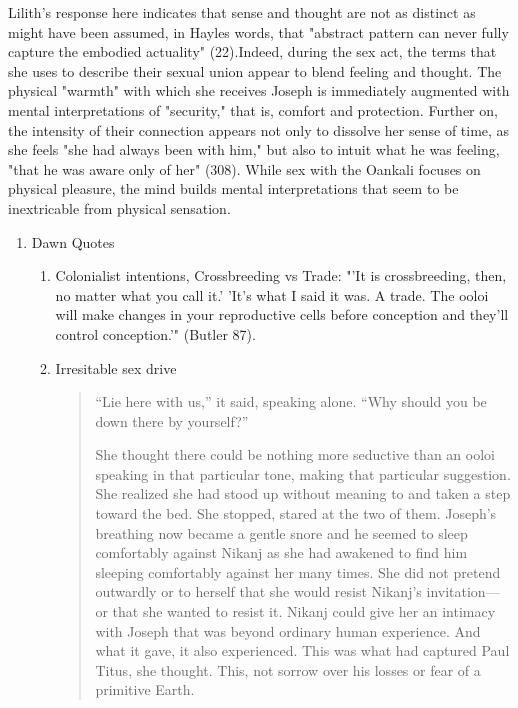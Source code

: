 \documentclass[11pt]{article}
\begin{document}
Lilith's response here indicates that sense and thought are not as
distinct as might have been assumed, in Hayles words, that "abstract
pattern can never fully capture the embodied actuality" (22).Indeed,
during the sex act, the terms that she uses to describe their sexual
union appear to blend feeling and thought. The physical "warmth" with
which she receives Joseph is immediately augmented with mental
interpretations of "security," that is, comfort and
protection. Further on, the intensity of their connection appears not
only to dissolve her sense of time, as she feels "she had always been
with him," but also to intuit what he was feeling, "that he was aware
only of her" (308). While sex with the Oankali focuses on physical
pleasure, the mind builds mental interpretations that seem to be
inextricable from physical sensation.


\begin{enumerate}
\item Dawn Quotes
\label{sec:org2b53189}

\begin{enumerate}
\item Colonialist intentions, Crossbreeding vs Trade:
\label{sec:org4d32cbb}
"'It is crossbreeding, then, no matter what you call it.' 'It's what I
said it was. A trade. The ooloi will make changes in your reproductive
cells before conception and they’ll control conception.'" (Butler
87). 

\item Irresitable sex drive
\label{sec:orga03ea18}
\begin{quote}
“Lie here with us,” it said, speaking alone. “Why should you be down
there by yourself?”

She thought there could be nothing more seductive than an ooloi
speaking in that particular tone, making that particular
suggestion. She realized she had stood up without meaning to and taken
a step toward the bed. She stopped, stared at the two of
them. Joseph’s breathing now became a gentle snore and he seemed to
sleep comfortably against Nikanj as she had awakened to find him
sleeping comfortably against her many times. She did not pretend
outwardly or to herself that she would resist Nikanj’s invitation—or
that she wanted to resist it.  Nikanj could give her an intimacy with
Joseph that was beyond ordinary human experience. And what it gave, it
also experienced. This was what had captured Paul Titus, she
thought. This, not sorrow over his losses or fear of a primitive
Earth.
\end{quote}
\end{enumerate}
\end{enumerate}
\end{document}

